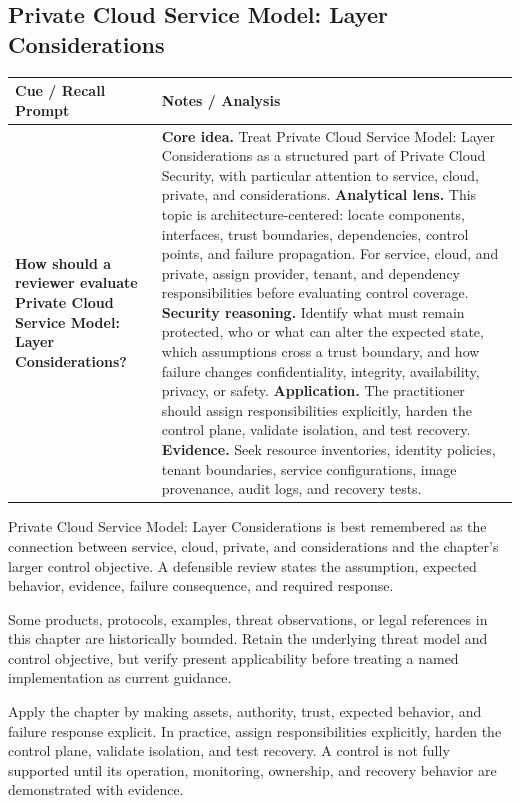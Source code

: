 \documentclass[11pt]{article}
\newcommand{\CornellHeader}{%
\rowcolor{Navy}\color{white}\bfseries Cue / Recall Prompt & \color{white}\bfseries Notes / Analysis\\\hline}
\newcommand{\CornellRow}[2]{%
\cellcolor{CueGray}\RaggedRight\textbf{#1} & \RaggedRight #2\\\hline}
\begin{document}
\subsection*{Private Cloud Service Model: Layer Considerations}
\begin{longtable}{>{\RaggedRight\arraybackslash}p{}|>{\RaggedRight\arraybackslash}p{}}
\CornellHeader
\CornellRow{How should a reviewer evaluate Private Cloud Service Model: Layer Considerations?}{\textbf{Core idea.} Treat Private Cloud Service Model: Layer Considerations as a structured part of Private Cloud Security, with particular attention to service, cloud, private, and considerations. \textbf{Analytical lens.} This topic is architecture-centered: locate components, interfaces, trust boundaries, dependencies, control points, and failure propagation. For service, cloud, and private, assign provider, tenant, and dependency responsibilities before evaluating control coverage. \textbf{Security reasoning.} Identify what must remain protected, who or what can alter the expected state, which assumptions cross a trust boundary, and how failure changes confidentiality, integrity, availability, privacy, or safety. \textbf{Application.} The practitioner should assign responsibilities explicitly, harden the control plane, validate isolation, and test recovery. \textbf{Evidence.} Seek resource inventories, identity policies, tenant boundaries, service configurations, image provenance, audit logs, and recovery tests.}
\end{longtable}
\begin{topicsummary}
Private Cloud Service Model: Layer Considerations is best remembered as the connection between service, cloud, private, and considerations and the chapter's larger control objective. A defensible review states the assumption, expected behavior, evidence, failure consequence, and required response.
\end{topicsummary}
\begin{historybox}
Some products, protocols, examples, threat observations, or legal references in this chapter are historically bounded. Retain the underlying threat model and control objective, but verify present applicability before treating a named implementation as current guidance.
\end{historybox}
\begin{defensebox}
Apply the chapter by making assets, authority, trust, expected behavior, and failure response explicit. In practice, assign responsibilities explicitly, harden the control plane, validate isolation, and test recovery. A control is not fully supported until its operation, monitoring, ownership, and recovery behavior are demonstrated with evidence.
\end{defensebox}
\end{document}
